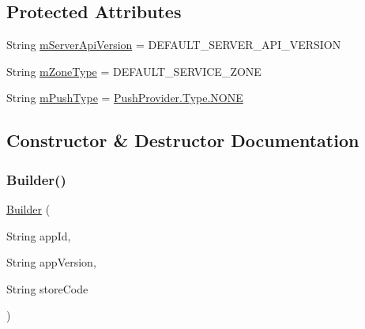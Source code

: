 \subsection*{Protected Attributes}
\begin{DoxyCompactItemize}
\item 
String \hyperlink{classcom_1_1toast_1_1android_1_1gamebase_1_1_gamebase_configuration_1_1_builder_a3eb98d37071bb4191379d3c7abc99e1f}{m\+Server\+Api\+Version} = D\+E\+F\+A\+U\+L\+T\+\_\+\+S\+E\+R\+V\+E\+R\+\_\+\+A\+P\+I\+\_\+\+V\+E\+R\+S\+I\+ON
\item 
String \hyperlink{classcom_1_1toast_1_1android_1_1gamebase_1_1_gamebase_configuration_1_1_builder_a0840098c9ced2a27e2501e04b5e5bdd9}{m\+Zone\+Type} = D\+E\+F\+A\+U\+L\+T\+\_\+\+S\+E\+R\+V\+I\+C\+E\+\_\+\+Z\+O\+NE
\item 
String \hyperlink{classcom_1_1toast_1_1android_1_1gamebase_1_1_gamebase_configuration_1_1_builder_ab8e6e24325203c691ba2cc841230969f}{m\+Push\+Type} = \hyperlink{classcom_1_1toast_1_1android_1_1gamebase_1_1base_1_1push_1_1_push_provider_1_1_type_aca69a8e523ec6acc3ed4a57492b9c73f}{Push\+Provider.\+Type.\+N\+O\+NE}
\end{DoxyCompactItemize}


\subsection{Constructor \& Destructor Documentation}
\mbox{\label{classcom_1_1toast_1_1android_1_1gamebase_1_1_gamebase_configuration_1_1_builder_ab8dce20a5e0f4a689574d947e05a4feb}} 
\subsubsection{\texorpdfstring{Builder()}{Builder()}\hspace{0.1cm}{\footnotesize\ttfamily [1/2]}}
{\footnotesize\ttfamily \hyperlink{classcom_1_1toast_1_1android_1_1gamebase_1_1_gamebase_configuration_1_1_builder}{Builder} (\begin{DoxyParamCaption}\item[{String}]{app\+Id,  }\item[{String}]{app\+Version,  }\item[{String}]{store\+Code }\end{DoxyParamCaption})\hspace{0.3cm}{\ttfamily [protected]}}

